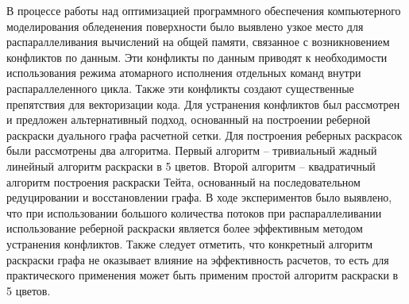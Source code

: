 В процессе работы над оптимизацией программного обеспечения компьютерного моделирования обледенения поверхности было выявлено узкое место для распараллеливания вычислений на общей памяти, связанное с возникновением конфликтов по данным.
Эти конфликты по данным приводят к необходимости использования режима атомарного исполнения отдельных команд внутри распараллеленного цикла.
Также эти конфликты создают существенные препятствия для векторизации кода.
Для устранения конфликтов был рассмотрен и предложен альтернативный подход, основанный на построении реберной раскраски дуального графа расчетной сетки. Для построения реберных раскрасок были рассмотрены два алгоритма.
Первый алгоритм – тривиальный жадный линейный алгоритм раскраски в 5 цветов.
Второй алгоритм – квадратичный алгоритм построения раскраски Тейта, основанный на последовательном редуцировании и восстановлении графа.
В ходе экспериментов было выявлено, что при использовании большого количества потоков при распараллеливании использование реберной раскраски является более эффективным методом устранения конфликтов.
Также следует отметить, что конкретный алгоритм раскраски графа не оказывает влияние на эффективность расчетов, то есть для практического применения может быть применим простой алгоритм раскраски в 5 цветов.
